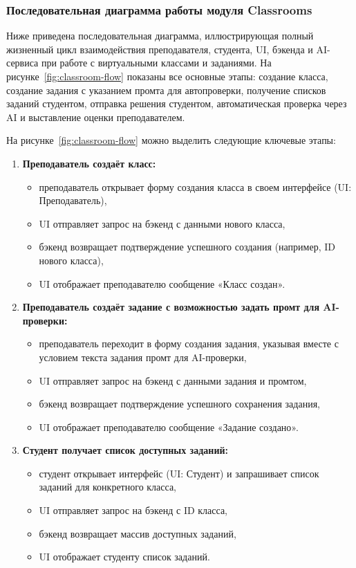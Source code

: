 \subsubsection{Последовательная диаграмма работы модуля Classrooms}
Ниже приведена последовательная диаграмма, иллюстрирующая полный жизненный цикл взаимодействия преподавателя, студента, UI, бэкенда и AI-сервиса при работе с виртуальными классами и заданиями. На рисунке~\ref{fig:classroom-flow} показаны все основные этапы: создание класса, создание задания с указанием промта для автопроверки, получение списков заданий студентом, отправка решения студентом, автоматическая проверка через AI и выставление оценки преподавателем.

На рисунке~\ref{fig:classroom-flow} можно выделить следующие ключевые этапы:

\begin{enumerate}
    \item \textbf{Преподаватель создаёт класс:}
    \begin{itemize}
        \item преподаватель открывает форму создания класса в своем интерфейсе (UI: Преподаватель),
        \item UI отправляет запрос на бэкенд с данными нового класса,
        \item бэкенд возвращает подтверждение успешного создания (например, ID нового класса),
        \item UI отображает преподавателю сообщение «Класс создан».
    \end{itemize}

    \item \textbf{Преподаватель создаёт задание с возможностью задать промт для AI-проверки:}
    \begin{itemize}
        \item преподаватель переходит в форму создания задания, указывая вместе с условием текста задания промт для AI-проверки,
        \item UI отправляет запрос на бэкенд с данными задания и промтом,
        \item бэкенд возвращает подтверждение успешного сохранения задания,
        \item UI отображает преподавателю сообщение «Задание создано».
    \end{itemize}

    \item \textbf{Студент получает список доступных заданий:}
    \begin{itemize}
        \item студент открывает интерфейс (UI: Студент) и запрашивает список заданий для конкретного класса,
        \item UI отправляет запрос на бэкенд с ID класса,
        \item бэкенд возвращает массив доступных заданий,
        \item UI отображает студенту список заданий.
    \end{itemize}


\end{enumerate}
